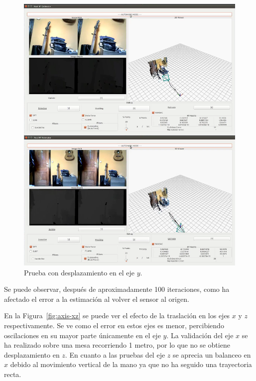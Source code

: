 \begin{figure}[th]
\centering
\includegraphics[scale=0.3]{Figures/tests/axis-y.png}
\decoRule
\caption[Prueba con desplazamiento en el eje $y$]{Prueba con desplazamiento en el eje $y$.}
\label{fig:axis-y}
\end{figure}

Se puede observar, después de aproximadamente 100 iteraciones, como ha afectado el error a la estimación al volver el sensor al origen.

En la Figura~\ref{fig:axis-xz} se puede ver el efecto de la traslación en los ejes $x$ y $z$ respectivamente. Se ve como el error en estos ejes es menor, percibiendo oscilaciones en su mayor parte únicamente en el eje $y$. La validación del eje $x$ se ha realizado sobre una mesa recorriendo 1 metro, por lo que no se obtiene desplazamiento en $z$. En cuanto a las pruebas del eje $z$ se aprecia un balanceo en $x$ debido al movimiento vertical de la mano ya que no ha seguido una trayectoria recta.

